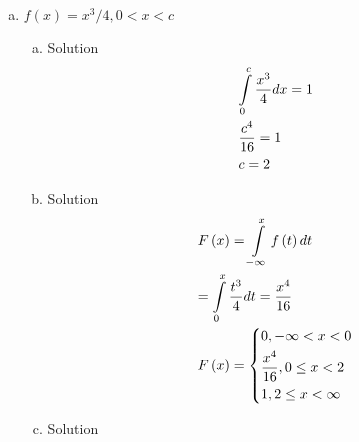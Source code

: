 \documentclass{article}
\begin{document}
\begin{spacing}{1.1}
\begin{homeworkProblem}
\begin{enumerate}[(a)]
		\item $f(x) = x^3/4, 0 < x < c$
			\begin{enumerate}[(a)]
				\item
					\begin{homeworkSection}{Solution}
						\[\begin{gathered}
						  \int\limits_0^c {\frac{{{x^3}}}{4}dx}  = 1 \hfill \\
						  \frac{{{c^4}}}{{16}} = 1 \hfill \\
						  c = 2 \hfill \\ 
						\end{gathered} \]
					\end{homeworkSection}
				\item
					\begin{homeworkSection}{Solution}
						\[\begin{gathered}
						  F\left( x \right) = \int\limits_{ - \infty }^x {f\left( t \right)dt}  \hfill \\
						   = \int\limits_0^x {\frac{{{t^3}}}{4}dt}  = \frac{{{x^4}}}{{16}} \hfill \\
						  F\left( x \right) = \left\{ \begin{gathered}
						  0, - \infty  < x < 0 \hfill \\
						  \frac{{{x^4}}}{{16}},0 \le x < 2 \hfill \\
						  1,2 \le x < \infty  \hfill \\ 
						\end{gathered}  \right. \hfill \\ 
						\end{gathered} \]
					\end{homeworkSection}
				\item
					\begin{homeworkSection}{Solution}
								

\end{homeworkSection}
\end{enumerate}
\end{enumerate}
\end{homeworkProblem}
\end{spacing}
\end{document}
